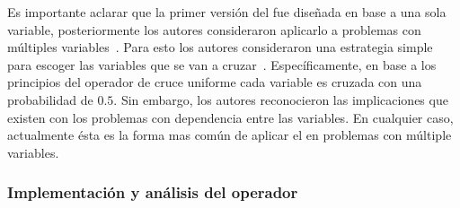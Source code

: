 Es importante aclarar que la primer versión del \SBX{} fue diseñada en base a una sola variable, posteriormente los autores consideraron aplicarlo a problemas con múltiples variables~\cite{Joel:SBX1994}.
%
Para esto los autores consideraron una estrategia simple para escoger las variables que se van a cruzar~\cite{Joel:UNDX}.
%
Específicamente, en base a los principios del operador de cruce uniforme cada variable es cruzada con una probabilidad de $0.5$.
%
Sin embargo, los autores reconocieron las implicaciones que existen con los problemas con dependencia entre las variables.
%
En cualquier caso, actualmente ésta es la forma mas común de aplicar el \SBX{} en problemas con múltiple variables.
%

\subsubsection{Implementación y análisis del operador \SBX{}}

